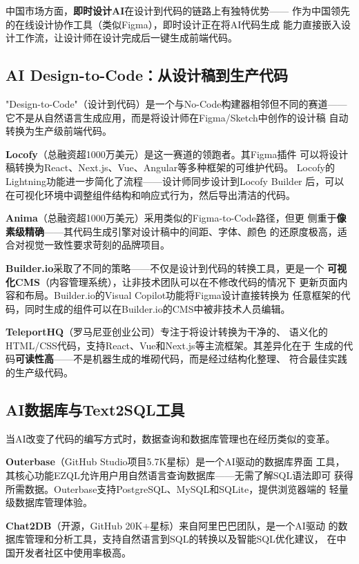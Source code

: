 中国市场方面，\textbf{即时设计AI}在设计到代码的链路上有独特优势——
作为中国领先的在线设计协作工具（类似Figma），即时设计正在将AI代码生成
能力直接嵌入设计工作流，让设计师在设计完成后一键生成前端代码。

\subsection{AI Design-to-Code：从设计稿到生产代码}
\label{subsec:design-to-code}

"Design-to-Code"（设计到代码）是一个与No-Code构建器相邻但不同的赛道——
它不是从自然语言生成应用，而是将设计师在Figma/Sketch中创作的设计稿
自动转换为生产级前端代码。

\textbf{Locofy}（总融资超1000万美元）是这一赛道的领跑者。其Figma插件
可以将设计稿转换为React、Next.js、Vue、Angular等多种框架的可维护代码。
Locofy的Lightning功能进一步简化了流程——设计师同步设计到Locofy Builder
后，可以在可视化环境中调整组件结构和响应式行为，然后导出清洁的代码。

\textbf{Anima}（总融资超1000万美元）采用类似的Figma-to-Code路径，但更
侧重于\textbf{像素级精确}——其代码生成引擎对设计稿中的间距、字体、颜色
的还原度极高，适合对视觉一致性要求苛刻的品牌项目。

\textbf{Builder.io}采取了不同的策略——不仅是设计到代码的转换工具，更是一个
\textbf{可视化CMS}（内容管理系统），让非技术团队可以在不修改代码的情况下
更新页面内容和布局。Builder.io的Visual Copilot功能将Figma设计直接转换为
任意框架的代码，同时生成的组件可以在Builder.io的CMS中被非技术人员编辑。

\textbf{TeleportHQ}（罗马尼亚创业公司）专注于将设计转换为干净的、
语义化的HTML/CSS代码，支持React、Vue和Next.js等主流框架。其差异化在于
生成的代码\textbf{可读性高}——不是机器生成的堆砌代码，而是经过结构化整理、
符合最佳实践的生产级代码。

\subsection{AI数据库与Text2SQL工具}
\label{subsec:ai-database}

当AI改变了代码的编写方式时，数据查询和数据库管理也在经历类似的变革。

\textbf{Outerbase}（GitHub Studio项目5.7K星标）是一个AI驱动的数据库界面
工具，其核心功能EZQL允许用户用自然语言查询数据库——无需了解SQL语法即可
获得所需数据。Outerbase支持PostgreSQL、MySQL和SQLite，提供浏览器端的
轻量级数据库管理体验。

\textbf{Chat2DB}（开源，GitHub 20K+星标）来自阿里巴巴团队，是一个AI驱动
的数据库管理和分析工具，支持自然语言到SQL的转换以及智能SQL优化建议，
在中国开发者社区中使用率极高。

